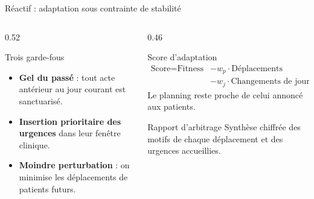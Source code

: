 \begin{frame}{Réactif : adaptation sous contrainte de stabilité}
  \small
  \begin{columns}[T,onlytextwidth]
    \begin{column}{0.52\textwidth}
      \begin{block}{Trois garde-fous}
        \begin{itemize}
          \item \textbf{Gel du passé} : tout acte antérieur au jour courant est
            sanctuarisé.
          \item \textbf{Insertion prioritaire des urgences} dans leur fenêtre
            clinique.
          \item \textbf{Moindre perturbation} : on minimise les déplacements de
            patients futurs.
        \end{itemize}
      \end{block}
    \end{column}
    \begin{column}{0.46\textwidth}
      \begin{alertblock}{Score d'adaptation}
        \footnotesize
        \[
          \begin{aligned}
            \text{Score} = \text{Fitness} &- w_p \cdot \text{Déplacements} \\
                                          &- w_j \cdot \text{Changements de jour}
          \end{aligned}
        \]
        Le planning reste proche de celui annoncé aux patients.
      \end{alertblock}
      \begin{exampleblock}{Rapport d'arbitrage}
        \footnotesize Synthèse chiffrée des motifs de chaque déplacement et des
        urgences accueillies.
      \end{exampleblock}
    \end{column}
  \end{columns}
\end{frame}

